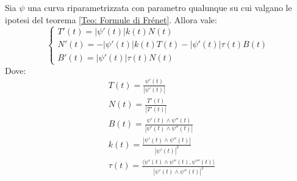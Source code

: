 \begin{theorem}
    Sia $\psi$ una curva riparametrizzata con parametro qualunque su cui valgano le ipotesi del teorema \ref{Teo: Formule di Frénet}. Allora vale:
    \begin{equation}
        \begin{cases}
            T'(t)=|\psi'(t)| k(t) N(t)\\
            N'(t)=-|\psi'(t)| k(t) T(t) - |\psi'(t)| \tau(t)B(t)\\
            B'(t)=|\psi'(t)|\tau(t)N(t)
        \end{cases}
    \end{equation}
    Dove:
    \begin{align}
        &T(t)=\frac{\psi'(t)}{|\psi'(t)|} \label{Eq: Frenet Tangente}\\
        &N(t)=\frac{T'(t)}{|T'(t)|} \label{Eq: Frenet Normale}\\
        &B(t)=\frac{\psi'(t)\wedge \psi''(t)} {|\psi'(t)\wedge \psi''(t)|} \label{Eq: Frenet Binormale}\\
        &k(t)=\frac{|\psi'(t)\wedge\psi''(t)|}{|\psi'(t)|^3} \label{Eq: Frenet Curvatura}\\
        &\tau(t)=\frac{\langle\psi'(t)\wedge \psi''(t), \psi'''(t)\rangle}{|\psi'(t)\wedge \psi''(t)|^2} \label{Eq: Frenet Torsione}
    \end{align}    
\end{theorem}
